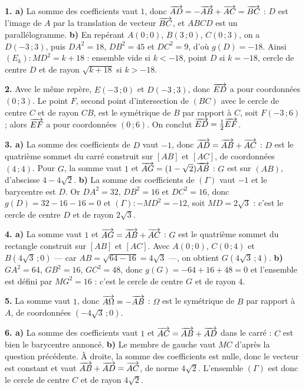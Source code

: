 \begin{corrige}[annales]
\textbf{1. a)} La somme des coefficients vaut $1$, donc
$\overrightarrow{AD} = -\overrightarrow{AB}+\overrightarrow{AC} = \overrightarrow{BC}$ : $D$ est l'image de $A$ par
la translation de vecteur $\overrightarrow{BC}$, et $ABCD$ est un parallélogramme.
\textbf{b)} En repérant $A(0\,;0)$, $B(3\,;0)$, $C(0\,;3)$, on a
$D(-3\,;3)$, puis $DA^{2} = 18$, $DB^{2} = 45$ et $DC^{2} = 9$, d'où
$g(D) = -18$. Ainsi $(E_{k}) : MD^{2} = k+18$ : ensemble vide si $k<-18$,
point $D$ si $k = -18$, cercle de centre $D$ et de rayon $\sqrt{k+18}$ si
$k>-18$.

\textbf{2.} Avec le même repère, $E(-3\,;0)$ et $D(-3\,;3)$, donc
$\overrightarrow{ED}$ a pour coordonnées $(0\,;3)$. Le point $F$, second point
d'intersection de $(BC)$ avec le cercle de centre $C$ et de rayon $CB$, est le
symétrique de $B$ par rapport à $C$, soit $F(-3\,;6)$ ; alors $\overrightarrow{EF}$ a
pour coordonnées $(0\,;6)$. On conclut
$\overrightarrow{ED} = \frac12\overrightarrow{EF}$.

\textbf{3. a)} La somme des coefficients de $D$ vaut $-1$, donc
$\overrightarrow{AD} = \overrightarrow{AB}+\overrightarrow{AC}$ : $D$ est le quatrième sommet du carré
construit sur $[AB]$ et $[AC]$, de coordonnées $(4\,;4)$. Pour $G$, la somme
vaut $1$ et $\overrightarrow{AG} = (1-\sqrt2)\overrightarrow{AB}$ : $G$ est sur $(AB)$, d'abscisse
$4-4\sqrt2$.
\textbf{b)} La somme des coefficients de $(\Gamma)$ vaut $-1$ et le barycentre
est $D$. Or $DA^{2} = 32$, $DB^{2} = 16$ et $DC^{2} = 16$, donc
$g(D) = 32-16-16 = 0$ et $(\Gamma) : -MD^{2} = -12$, soit $MD = 2\sqrt3$ :
c'est le cercle de centre $D$ et de rayon $2\sqrt3$.

\textbf{4. a)} La somme vaut $1$ et $\overrightarrow{AG} = \overrightarrow{AB}+\overrightarrow{AC}$ : $G$
est le quatrième sommet du rectangle construit sur $[AB]$ et $[AC]$. Avec
$A(0\,;0)$, $C(0\,;4)$ et $B\left(4\sqrt3\,;0\right)$ — car
$AB = \sqrt{64-16} = 4\sqrt3$ —, on obtient $G\left(4\sqrt3\,;4\right)$.
\textbf{b)} $GA^{2} = 64$, $GB^{2} = 16$, $GC^{2} = 48$, donc
$g(G) = -64+16+48 = 0$ et l'ensemble est défini par $MG^{2} = 16$ : c'est le
cercle de centre $G$ et de rayon $4$.

\textbf{5.} La somme vaut $1$, donc $\overrightarrow{A\Omega} = -\overrightarrow{AB}$ : $\Omega$
est le symétrique de $B$ par rapport à $A$, de coordonnées
$\left(-4\sqrt3\,;0\right)$.

\textbf{6. a)} La somme des coefficients vaut $1$ et
$\overrightarrow{AC} = \overrightarrow{AB}+\overrightarrow{AD}$ dans le carré : $C$ est bien le barycentre
annoncé.
\textbf{b)} Le membre de gauche vaut $MC$ d'après la question précédente. À
droite, la somme des coefficients est nulle, donc le vecteur est constant et
vaut $\overrightarrow{AB}+\overrightarrow{AD} = \overrightarrow{AC}$, de norme $4\sqrt2$. L'ensemble
$(\Gamma)$ est donc le cercle de centre $C$ et de rayon $4\sqrt2$.


\end{corrige}
